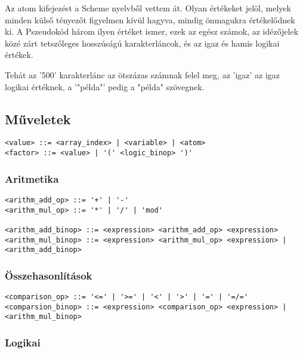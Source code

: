 Az atom kifejezést a Scheme nyelvből vettem át. Olyan értékeket jelöl, melyek minden külső tényezőt figyelmen kívül hagyva, mindig önmagukra értékelődnek ki. A Pszeudokód három ilyen értéket ismer, ezek az egész számok, az idézőjelek közé zárt tetszőleges hosszúságú karakterláncok, és az igaz és hamis logikai értékek.

Tehát az '500' karakterlánc az ötszázas számnak felel meg, az 'igaz' az igaz logikai értéknek, a '"példa"' pedig a "példa" szövegnek.

\subsection{Műveletek}

\begin{footnotesize}
\begin{verbatim}
<value> ::= <array_index> | <variable> | <atom>
<factor> ::= <value> | '(' <logic_binop> ')'
\end{verbatim}
\end{footnotesize}

\subsubsection{Aritmetika}

\begin{footnotesize}
\begin{verbatim}
<arithm_add_op> ::= '+' | '-'
<arithm_mul_op> ::= '*' | '/' | 'mod'

<arithm_add_binop> ::= <expression> <arithm_add_op> <expression>
<arithm_mul_binop> ::= <expression> <arithm_mul_op> <expression> | <arithm_add_binop>
\end{verbatim}
\end{footnotesize}

\subsubsection{Összehasonlítások}

\begin{footnotesize}
\begin{verbatim}
<comparison_op> ::= '<=' | '>=' | '<' | '>' | '=' | '=/='
<comparsion_binop> ::= <expression> <comparison_op> <expression> | <arithm_mul_binop>
\end{verbatim}
\end{footnotesize}

\subsubsection{Logikai}

